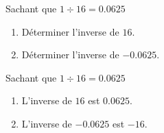 \begin{exercice*}
    Sachant que $1\div 16 = \num{0.0625}$    
        \begin{enumerate}
            \item Déterminer l'inverse de $16$.
            \item Déterminer l'inverse de $-\num{0.0625}$.
        \end{enumerate}
\end{exercice*}
\begin{corrige}
    Sachant que $1\div 16 = \num{0.0625}$ 
       
        \begin{enumerate}
            \item L'inverse de $16$ est $\num{0.0625}$.
            \item L'inverse de $-\num{0.0625}$ est $-16$.
        \end{enumerate}
\end{corrige}

